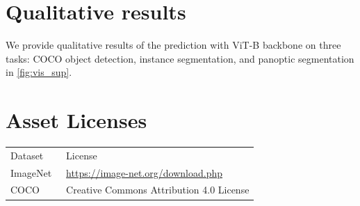\section{Qualitative results}

We provide qualitative results of the \ours prediction with ViT-B backbone on three tasks: COCO object detection, instance segmentation, and panoptic segmentation in \cref{fig:vis_sup}.

\section{Asset Licenses}

\begin{center}
\footnotesize
\begin{tabular}{l|l}
Dataset & License \\
\shline
ImageNet~\citep{deng2009imagenet}& \url{https://image-net.org/download.php} \\
COCO~\citep{lin2014mscoco}       & Creative Commons Attribution 4.0 License \\
\end{tabular}
\end{center}
